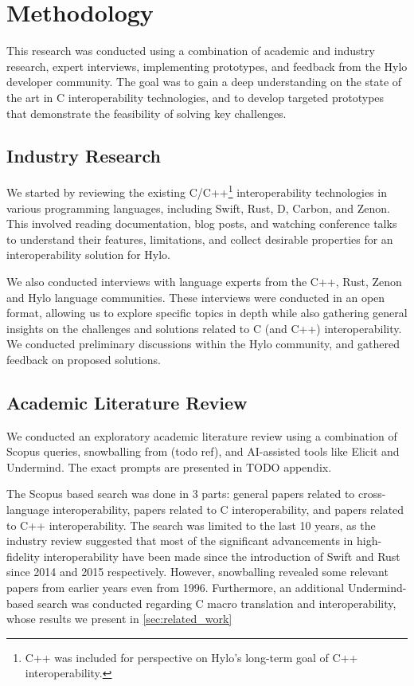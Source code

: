 \section{Methodology}
\label{sec:methodology}
This research was conducted using a combination of academic and industry research, expert interviews, implementing prototypes, and feedback from the Hylo developer community. The goal was to gain a deep understanding on the state of the art in C interoperability technologies, and to develop targeted prototypes that demonstrate the feasibility of solving key challenges. 

\subsection{Industry Research}
We started by reviewing the existing C/C++\footnote{C++ was included for perspective on Hylo's long-term goal of C++ interoperability.} interoperability technologies in various programming languages, including Swift, Rust, D, Carbon, and Zenon. This involved reading documentation, blog posts, and watching conference talks to understand their features, limitations, and collect desirable properties for an interoperability solution for Hylo.

We also conducted interviews with language experts from the C++, Rust, Zenon and Hylo language communities. These interviews were conducted in an open format, allowing us to explore specific topics in depth while also gathering general insights on the challenges and solutions related to C (and C++) interoperability. We conducted preliminary discussions within the Hylo community, and gathered feedback on proposed solutions.

\subsection{Academic Literature Review}
We conducted an exploratory academic literature review using a combination of Scopus queries, snowballing from (todo ref), and AI-assisted tools like Elicit and Undermind. The exact prompts are presented in TODO appendix.

The Scopus based search was done in 3 parts: general papers related to cross-language interoperability, papers related to C interoperability, and papers related to C++ interoperability. The search was limited to the last 10 years, as the industry review suggested that most of the significant advancements in high-fidelity interoperability have been made since the introduction of Swift and Rust since 2014 and 2015 respectively. However, snowballing revealed some relevant papers from earlier years even from 1996. Furthermore, an additional Undermind-based search was conducted regarding C macro translation and interoperability, whose results we present in \autoref{sec:related_work}

